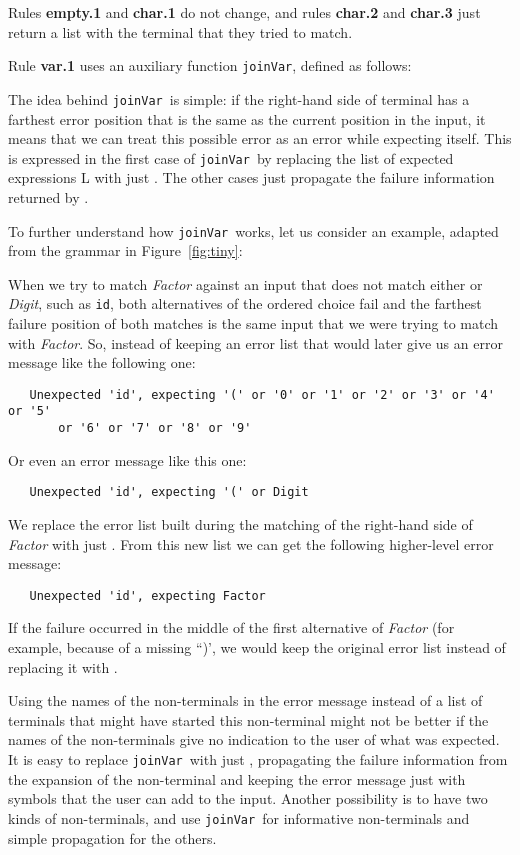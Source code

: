 \documentclass[3p,12pt,singlecolumn]{elsarticle}
\newcommand{\Jv}{{\tt joinVar}}
\begin{document}
Rules {\bf empty.1} and {\bf char.1} do not change,
and rules {\bf char.2} and {\bf char.3} just 
return a list with the terminal that
they tried to match.

Rule {\bf var.1} uses an auxiliary function \Jv, defined
as follows:


The idea behind \Jv\ is simple: if the right-hand side
of terminal  has a farthest error position that is the
same as the current position in the input, it means that
we can treat this possible error as an error while
expecting  itself. This is expressed in the first
case of \Jv\ by replacing the list of expected expressions
L with just . The other cases just propagate the
failure information returned by .

To further understand how \Jv\ works, let us consider an example,
adapted from the grammar in Figure~\ref{fig:tiny}:


When we try to match {\it Factor} against
an input that does not match either 
or {\it Digit}, such as \texttt{id}, both
alternatives of the ordered choice fail and the farthest
failure position of both matches is the same input that
we were trying to match with {\it Factor}.
So, instead of keeping
an error list that would later give us an error message like
the following one:
\begin{verbatim}
   Unexpected 'id', expecting '(' or '0' or '1' or '2' or '3' or '4' or '5'
       or '6' or '7' or '8' or '9'
\end{verbatim}

Or even an error message like this one:
\begin{verbatim}
   Unexpected 'id', expecting '(' or Digit
\end{verbatim}

We replace the error list built during the matching of
the right-hand side of {\it Factor} with just .
From this new list we can get the following higher-level
error message:
\begin{verbatim}
   Unexpected 'id', expecting Factor
\end{verbatim}

If the failure occurred in the middle of the first
alternative of {\it Factor} (for example, because of a missing ``)',
we would keep the original error list instead of replacing
it with .

Using the names of the non-terminals in the error message instead
of a list of terminals that might have started this non-terminal
might not be better if the names of the non-terminals give no
indication to the user of what was expected. It is easy
to replace \Jv\ with just , propagating the failure
information from the expansion of the non-terminal and keeping
the error message just with symbols that the user can add
to the input. Another possibility is to have two kinds of
non-terminals, and use \Jv\ for informative non-terminals and
simple propagation for the others.
\end{document}
